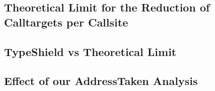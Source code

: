 %	
%	
%	
%
%

\subsection{Theoretical Limit for the Reduction of Calltargets per Callsite}
\label{subsection:theoreticallimit}

\subsection{TypeShield vs Theoretical Limit}
\label{subsection:typeshieldvslimit}

\subsection{Effect of our AddressTaken Analysis}
\label{subsection:effectivenessaddresstaken}

